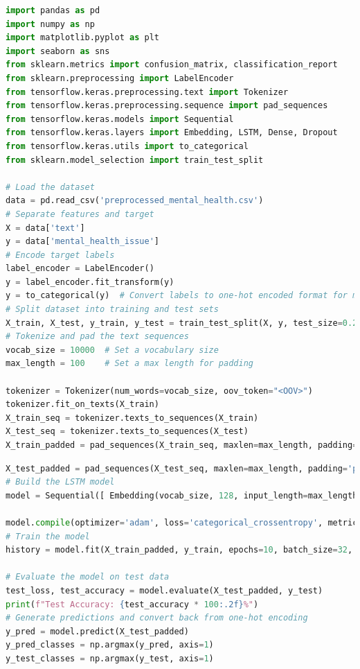 \begin{tcolorbox}[colback=gray!5!white, colframe=gray!80!black, boxrule=0.5pt, title=LSTM Model Implementation]
    \begin{lstlisting}[language=Python]
import pandas as pd
import numpy as np
import matplotlib.pyplot as plt
import seaborn as sns
from sklearn.metrics import confusion_matrix, classification_report
from sklearn.preprocessing import LabelEncoder
from tensorflow.keras.preprocessing.text import Tokenizer
from tensorflow.keras.preprocessing.sequence import pad_sequences
from tensorflow.keras.models import Sequential
from tensorflow.keras.layers import Embedding, LSTM, Dense, Dropout
from tensorflow.keras.utils import to_categorical
from sklearn.model_selection import train_test_split

# Load the dataset
data = pd.read_csv('preprocessed_mental_health.csv')
# Separate features and target
X = data['text']
y = data['mental_health_issue']
# Encode target labels
label_encoder = LabelEncoder()
y = label_encoder.fit_transform(y)
y = to_categorical(y)  # Convert labels to one-hot encoded format for multi-class classification
# Split dataset into training and test sets
X_train, X_test, y_train, y_test = train_test_split(X, y, test_size=0.2, random_state=42)
# Tokenize and pad the text sequences
vocab_size = 10000  # Set a vocabulary size
max_length = 100    # Set a max length for padding

tokenizer = Tokenizer(num_words=vocab_size, oov_token="<OOV>")
tokenizer.fit_on_texts(X_train)
X_train_seq = tokenizer.texts_to_sequences(X_train)
X_test_seq = tokenizer.texts_to_sequences(X_test)
X_train_padded = pad_sequences(X_train_seq, maxlen=max_length, padding='post', truncating='post')
\end{lstlisting}
\end{tcolorbox}

\begin{tcolorbox}[colback=gray!5!white, colframe=gray!80!black, boxrule=0.5pt, title=LSTM Model Implementation]
    \begin{lstlisting}[language=Python]
X_test_padded = pad_sequences(X_test_seq, maxlen=max_length, padding='post', truncating='post')
# Build the LSTM model
model = Sequential([ Embedding(vocab_size, 128, input_length=max_length), LSTM(128,eturn_sequences=True), Dropout(0.2), LSTM(64), Dropout(0.2), Dense(64,activation='relu'), Dense(y.shape[1],activation='softmax')])

model.compile(optimizer='adam', loss='categorical_crossentropy', metrics=['accuracy'])
# Train the model
history = model.fit(X_train_padded, y_train, epochs=10, batch_size=32, validation_data=(X_test_padded, y_test))

# Evaluate the model on test data
test_loss, test_accuracy = model.evaluate(X_test_padded, y_test)
print(f"Test Accuracy: {test_accuracy * 100:.2f}%")
# Generate predictions and convert back from one-hot encoding
y_pred = model.predict(X_test_padded)
y_pred_classes = np.argmax(y_pred, axis=1)
y_test_classes = np.argmax(y_test, axis=1)
\end{lstlisting}
\end{tcolorbox}

